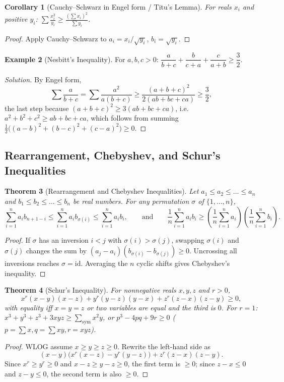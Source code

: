 \documentclass[11pt]{article}
\theoremstyle{plain}
\newtheorem{theorem}{Theorem}[section]
\newtheorem{corollary}[theorem]{Corollary}
\theoremstyle{definition}
\newtheorem{example}[theorem]{Example}
\newenvironment{solution}{\begin{proof}[Solution]}{\end{proof}}
\begin{document}
\begin{corollary}[Cauchy--Schwarz in Engel form / Titu's Lemma]
For reals $x_i$ and positive $y_i$:
$\displaystyle \sum \frac{x_i^2}{y_i} \ge \frac{(\sum x_i)^2}{\sum y_i}$.
\end{corollary}
\begin{proof}
Apply Cauchy--Schwarz to $a_i = x_i/\sqrt{y_i}$, $b_i = \sqrt{y_i}$.
\end{proof}

\begin{example}[Nesbitt's Inequality]
For $a,b,c>0$:
$\dfrac{a}{b+c}+\dfrac{b}{c+a}+\dfrac{c}{a+b} \ge \dfrac32$.
\end{example}
\begin{solution}
By Engel form,
\[
\sum \frac{a}{b+c} = \sum \frac{a^2}{a(b+c)}
\ge \frac{(a+b+c)^2}{2(ab+bc+ca)} \ge \frac{3}{2},
\]
the last step because $(a+b+c)^2 \ge 3(ab+bc+ca)$, i.e.\
$a^2+b^2+c^2 \ge ab+bc+ca$, which follows from summing
$\frac12\bigl((a-b)^2 + (b-c)^2 + (c-a)^2\bigr) \ge 0$.
\end{solution}

\subsection{Rearrangement, Chebyshev, and Schur's Inequalities}

\begin{theorem}[Rearrangement and Chebyshev Inequalities]
Let $a_1 \le a_2 \le \dots \le a_n$ and $b_1 \le b_2 \le \dots \le b_n$ be real numbers. For any permutation $\sigma$ of $\{1,\dots,n\}$,
\[
\sum_{i=1}^n a_i b_{n+1-i} \le \sum_{i=1}^n a_i b_{\sigma(i)} \le \sum_{i=1}^n a_i b_i,
\qquad\text{and}\qquad
\frac{1}{n}\sum_{i=1}^n a_i b_i \ge \left(\frac{1}{n}\sum_{i=1}^n a_i\right)\left(\frac{1}{n}\sum_{i=1}^n b_i\right).
\]
\end{theorem}
\begin{proof}
If $\sigma$ has an inversion $i < j$ with $\sigma(i) > \sigma(j)$, swapping $\sigma(i)$ and $\sigma(j)$ changes the sum by $(a_j - a_i)(b_{\sigma(i)} - b_{\sigma(j)}) \ge 0$. Uncrossing all inversions reaches $\sigma = \mathrm{id}$. Averaging the $n$ cyclic shifts gives Chebyshev's inequality.
\end{proof}

\begin{theorem}[Schur's Inequality]
For nonnegative reals $x, y, z$ and $r > 0$,
\[
x^r(x-y)(x-z) + y^r(y-z)(y-x) + z^r(z-x)(z-y) \ge 0,
\]
with equality iff $x=y=z$ or two variables are equal and the third is $0$.
For $r = 1$: $x^3+y^3+z^3+3xyz \ge \sum_{\text{sym}} x^2 y$, or $p^3 - 4pq + 9r \ge 0$ ($p=\sum x, q=\sum xy, r=xyz$).
\end{theorem}
\begin{proof}
WLOG assume $x \ge y \ge z \ge 0$. Rewrite the left-hand side as
\[
(x-y)\bigl(x^r(x-z) - y^r(y-z)\bigr) + z^r(z-x)(z-y).
\]
Since $x^r \ge y^r \ge 0$ and $x-z \ge y-z \ge 0$, the first term is $\ge 0$; since $z-x \le 0$ and $z-y \le 0$, the second term is also $\ge 0$.
\end{proof}
\end{document}
